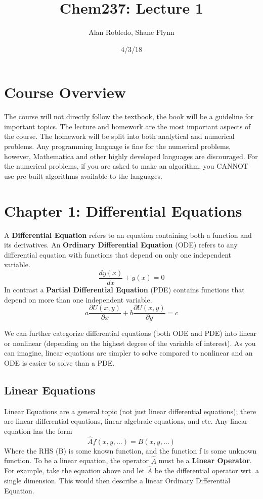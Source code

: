 \documentclass{article}
\title{Chem237: Lecture 1}
\date{4/3/18}
\author{Alan Robledo, Shane Flynn}
\newcommand{\be}{\begin{equation}}
\newcommand{\ee}{\end{equation}}
\newcommand{\pd}{\partial}
\begin{document}
\maketitle

\section*{Course Overview}
The course will not directly follow the textbook, the book will be a guideline for important topics.
The lecture and homework are the most important aspects of the course.
The homework will be split into both analytical and numerical problems.
Any programming language is fine for the numerical problems, however, Mathematica and other highly developed languages are discouraged.
For the numerical problems, if you are asked to make an algorithm, you CANNOT use pre-built algorithms available to the languages.

\section*{Chapter 1: Differential Equations}
A \textbf{Differential Equation} refers to an equation containing both a function and its derivatives.
An \textbf{Ordinary Differential Equation} (ODE) refers to any differential equation with functions that depend on only one independent variable.
\be
\frac{dy(x)}{dx} + y(x) = 0
\ee
In contrast a \textbf{Partial Differential Equation} (PDE) contains functions that depend on more than one independent variable.
\be
a \frac{\pd U(x,y)}{\pd x} + b \frac{\pd U(x,y)}{\pd y} = c
\ee

We can further categorize differential equations (both ODE and PDE) into linear or nonlinear (depending on the highest degree of the variable of interest). 
As you can imagine, linear equations are simpler to solve compared to nonlinear and an ODE is easier to solve than a PDE.

\subsection*{Linear Equations}
Linear Equations are a general topic (not just linear differential equations); there are linear differential equations, linear algebraic equations, and etc.
Any linear equation has the form
\be
\hat{A} f(x,y,\hdots) = B(x,y,\hdots)
\ee
Where the RHS (B) is some known function, and the function f is some unknown function.
To be a linear equation, the operator $\hat{A}$ must be a \textbf{Linear Operator}. 
For example, take the equation above and let $\hat{A}$ be the differential operator wrt. a single dimension.
This would then describe a linear Ordinary Differential Equation.
\end{document}
